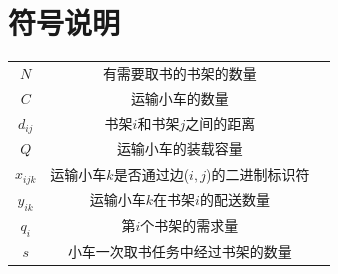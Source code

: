 \documentclass[withoutpreface,bwprint]{thesis-config}
\begin{document}
\section{符号说明}

\begin{table}[H]
	\centering
	\begin{tabular}{c c c}
		\toprule
		\makebox[0.3\textwidth][c]{符号}	&  \makebox[0.4\textwidth][c]{说明} \\ \hline
        $N$ & 有需要取书的书架的数量\\
        $C$ & 运输小车的数量\\
        $d_{ij}$ & 书架$i$和书架$j$之间的距离\\
        $Q$ & 运输小车的装载容量\\
        $x_{ijk}$ & 运输小车$k$是否通过边($i,j$)的二进制标识符\\
        $y_{ik}$  & 运输小车$k$在书架$i$的配送数量\\
        $q_i$ & 第$i$个书架的需求量\\
        $s$ & 小车一次取书任务中经过书架的数量\\
		\bottomrule
	\end{tabular}
\end{table}
\end{document}
